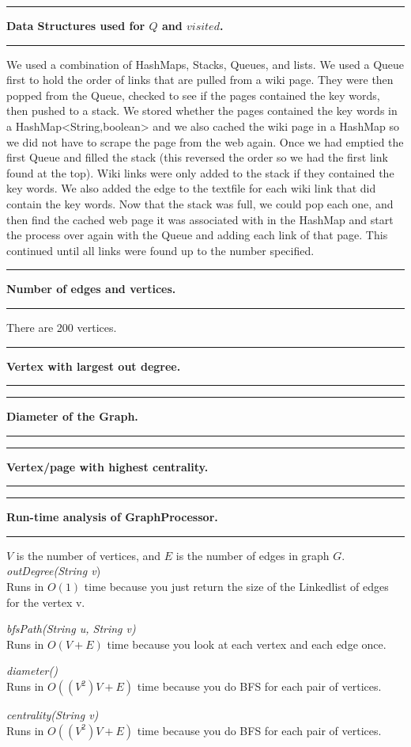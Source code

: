 \documentclass[11pt]{article}
\newcommand\question[2]{\vspace{.25in}\hrule\textbf{#1. #2}\vspace{.5em}\hrule\vspace{.10in}}
\begin{document}
\raggedright
\newcommand\NAME{Devin Johnson, Mason Wray}  %
\newcommand\HWNUM{ PA2}                      %



\question{Data Structures used for $Q$ and $visited$}{}
We used a combination of HashMaps, Stacks, Queues, and lists.  We used a Queue first to hold the order of links that are pulled from a wiki page.  They were then popped from the Queue, checked to see if the pages contained the key words, then pushed to a stack.  We stored whether the pages contained the key words in a HashMap<String,boolean> and we also cached the wiki page in a HashMap so we did not have to scrape the page from the web again.  Once we had emptied the first Queue and filled the stack (this reversed the order so we had the first link found at the top).  Wiki links were only added to the stack if they contained the key words.  We also added the edge to the textfile for each wiki link that did contain the key words.  Now that the stack was full, we could pop each one, and then find the cached web page it was associated with in the HashMap and start the process over again with the Queue and adding each link of that page.  This continued until all links were found up to the number specified.\\

\question{Number of edges and vertices}{}
There are 200 vertices.

\question{Vertex with largest out degree}{}

\question{Diameter of the Graph}{}

\question{Vertex/page with highest centrality}{}

\question{Run-time analysis of GraphProcessor}{}
$V$ is the number of vertices, and $E$ is the number of edges in graph $G$.\\ 
\vspace{3mm}
\textit{outDegree(String v})\\
Runs in $O(1)$ time because you just return the size of the Linkedlist of edges for the vertex v.

\vspace{3mm}
\textit{bfsPath(String u, String v)}\\
Runs in $O(V+E)$ time because you look at each vertex and each edge once.

\vspace{3mm}
\textit{diameter()}\\
Runs in $O((V^2)V+E)$ time because you do BFS for each pair of vertices.

\vspace{3mm}
\textit{centrality(String v)}\\
Runs in $O((V^2)V+E)$ time because you do BFS for each pair of vertices.
\end{document}
